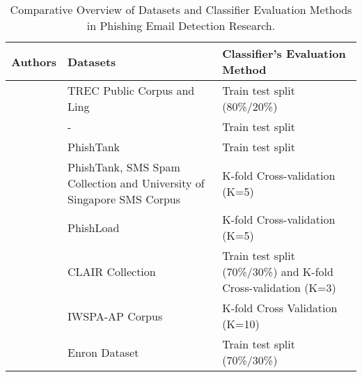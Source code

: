 \begin{table}[ht]
    \centering
    \begin{tabular}{p{4cm}p{5cm}p{6cm}}
    \hline
    \textbf{Authors} & \textbf{Datasets} & \textbf{Classifier's Evaluation Method} \\
    \hline
    \citet{rabbi2023phishy} & TREC Public Corpus and Ling & Train test split (80\%/20\%) \\
    \hline
    \citet{Kumar2023222} & - & Train test split \\
    \hline
    \citet{Shaukat2023} & PhishTank & Train test split \\
    \hline
    \citet{Karhani2023206} & PhishTank, SMS Spam Collection and University of Singapore SMS Corpus & K-fold Cross-validation (K=5)\\
    \hline
    \citet{Benavides-Astudillo2023} & PhishLoad & K-fold Cross-validation (K=5) \\
    \hline
    \citet{ALHOGAIL2021102414} & CLAIR Collection & Train test split (70\%/30\%) and K-fold Cross-validation (K=3) \\
    \hline
    \citet{8701426} & IWSPA-AP Corpus & K-fold Cross Validation (K=10) \\
    \hline
    \citet{atawneh2023phishing} & Enron Dataset & Train test split (70\%/30\%) \\
    \hline
    \end{tabular}
    \caption{Comparative Overview of Datasets and Classifier Evaluation Methods in Phishing Email Detection Research.}
    \label{tbl:c2:comparison_table_2}
    \end{table}